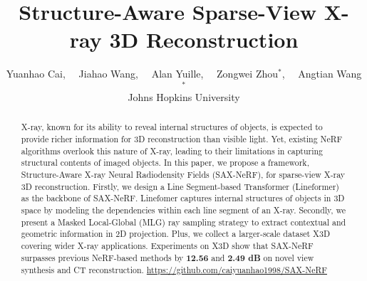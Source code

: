 \documentclass[10pt,twocolumn,letterpaper]{article}
\title{Structure-Aware Sparse-View X-ray 3D Reconstruction}
\author{Yuanhao Cai,~~ Jiahao Wang,~~ Alan Yuille,~~ Zongwei Zhou$^*$,~~ Angtian Wang$^*$ \\
	Johns Hopkins University
}
\begin{document}


\vspace{4mm}
\begin{abstract}
	\vspace{-4mm}
	X-ray, known for its ability to reveal internal structures of objects, is expected to provide richer information for 3D reconstruction than visible light. Yet, existing NeRF algorithms overlook this nature of X-ray, leading to their limitations in capturing structural contents of imaged objects. In this paper, we propose a framework, Structure-Aware X-ray Neural Radiodensity Fields (SAX-NeRF), for sparse-view X-ray 3D reconstruction. Firstly, we design a Line Segment-based Transformer (Lineformer) as the backbone of SAX-NeRF. Linefomer captures internal structures of objects in 3D space by modeling the dependencies within each line segment of an X-ray. Secondly, we present a Masked Local-Global (MLG) ray sampling strategy to extract contextual and geometric information in 2D projection. Plus, we collect a larger-scale dataset X3D covering wider X-ray applications. Experiments on X3D show that SAX-NeRF surpasses previous NeRF-based methods by \textbf{12.56} and \textbf{2.49 dB} on novel view synthesis and CT reconstruction.  \url{https://github.com/caiyuanhao1998/SAX-NeRF}
\end{abstract}

\vspace{-1mm}
\let\thefootnote\relax{}
\end{document}
